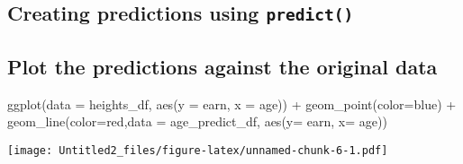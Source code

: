 \documentclass[
]{article}
\newenvironment{Shaded}{\begin{snugshade}}{\end{snugshade}}
\newcommand{\AttributeTok}[1]{\textcolor[rgb]{0.77,0.63,0.00}{#1}}
\newcommand{\FunctionTok}[1]{\textcolor[rgb]{0.00,0.00,0.00}{#1}}
\newcommand{\NormalTok}[1]{#1}
\newcommand{\OtherTok}[1]{\textcolor[rgb]{0.56,0.35,0.01}{#1}}
\newcommand{\SpecialCharTok}[1]{\textcolor[rgb]{0.00,0.00,0.00}{#1}}
\newcommand{\StringTok}[1]{\textcolor[rgb]{0.31,0.60,0.02}{#1}}
\begin{document}
\hypertarget{creating-predictions-using-predict}{%
\subsection{\texorpdfstring{Creating predictions using
\texttt{predict()}}{Creating predictions using predict()}}\label{creating-predictions-using-predict}}

\begin{Shaded}
\end{Shaded}

\hypertarget{plot-the-predictions-against-the-original-data}{%
\subsection{Plot the predictions against the original
data}\label{plot-the-predictions-against-the-original-data}}

\begin{Shaded}
\begin{Highlighting}[]
\FunctionTok{ggplot}\NormalTok{(}\AttributeTok{data =}\NormalTok{ heights\_df, }\FunctionTok{aes}\NormalTok{(}\AttributeTok{y =}\NormalTok{ earn, }\AttributeTok{x =}\NormalTok{ age)) }\SpecialCharTok{+}
  \FunctionTok{geom\_point}\NormalTok{(}\AttributeTok{color=}\StringTok{\textquotesingle{}blue\textquotesingle{}}\NormalTok{) }\SpecialCharTok{+}
  \FunctionTok{geom\_line}\NormalTok{(}\AttributeTok{color=}\StringTok{\textquotesingle{}red\textquotesingle{}}\NormalTok{,}\AttributeTok{data =}\NormalTok{ age\_predict\_df, }\FunctionTok{aes}\NormalTok{(}\AttributeTok{y=}\NormalTok{ earn, }\AttributeTok{x=}\NormalTok{ age))}
\end{Highlighting}
\end{Shaded}

\texttt{[image: Untitled2\_files/figure-latex/unnamed-chunk-6-1.pdf]}

\begin{Shaded}
\end{Shaded}
\end{document}
